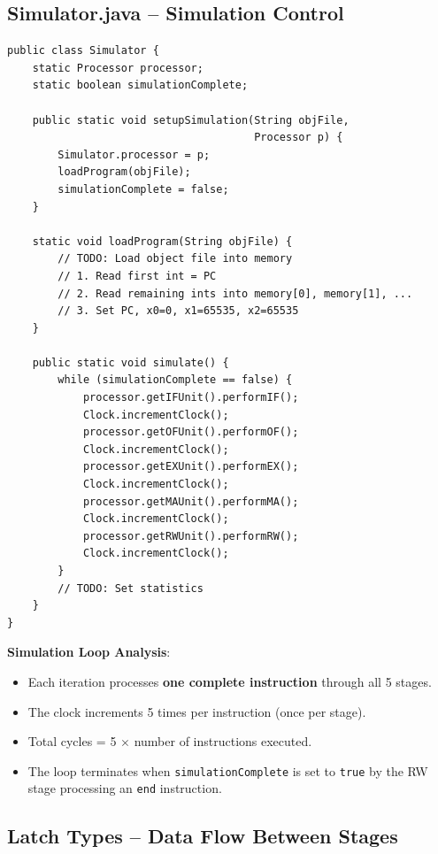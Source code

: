 \documentclass[12pt,a4paper]{article}
\begin{document}
\subsection{Simulator.java -- Simulation Control}

\begin{lstlisting}[style=javastyle, caption={Simulator.java}]
public class Simulator {
    static Processor processor;
    static boolean simulationComplete;

    public static void setupSimulation(String objFile,
                                       Processor p) {
        Simulator.processor = p;
        loadProgram(objFile);
        simulationComplete = false;
    }

    static void loadProgram(String objFile) {
        // TODO: Load object file into memory
        // 1. Read first int = PC
        // 2. Read remaining ints into memory[0], memory[1], ...
        // 3. Set PC, x0=0, x1=65535, x2=65535
    }

    public static void simulate() {
        while (simulationComplete == false) {
            processor.getIFUnit().performIF();
            Clock.incrementClock();
            processor.getOFUnit().performOF();
            Clock.incrementClock();
            processor.getEXUnit().performEX();
            Clock.incrementClock();
            processor.getMAUnit().performMA();
            Clock.incrementClock();
            processor.getRWUnit().performRW();
            Clock.incrementClock();
        }
        // TODO: Set statistics
    }
}
\end{lstlisting}

\textbf{Simulation Loop Analysis}:
\begin{itemize}
    \item Each iteration processes \textbf{one complete instruction} through all 5 stages.
    \item The clock increments 5 times per instruction (once per stage).
    \item Total cycles = 5 $\times$ number of instructions executed.
    \item The loop terminates when \texttt{simulationComplete} is set to \texttt{true} by the RW stage processing an \texttt{end} instruction.
\end{itemize}

\subsection{Latch Types -- Data Flow Between Stages}
\end{document}
